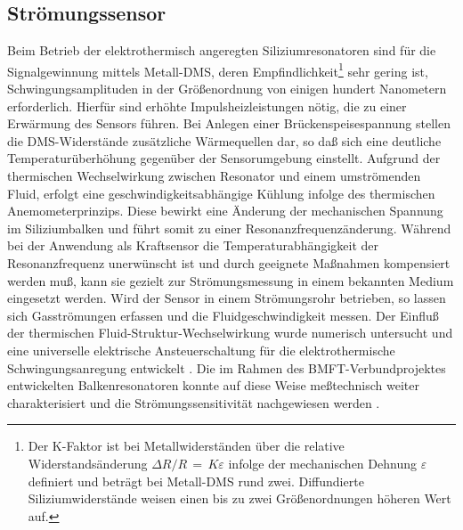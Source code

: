 \subsection{Strömungssensor}
\label{stroemungssensor}

Beim Betrieb der elektrothermisch angeregten Siliziumresonatoren sind
für die Signalgewinnung mittels Metall-DMS, deren
Empfindlichkeit\footnote{Der K-Faktor ist bei Metallwiderständen über
die relative Widerstandsänderung $\Delta R/R \, = \, K \varepsilon$
infolge der mechanischen Dehnung $\varepsilon$
definiert und beträgt bei Metall-DMS rund zwei. Diffundierte
Siliziumwiderstände weisen einen bis zu zwei Größenordnungen höheren
Wert auf.} sehr gering ist,
Schwingungsamplituden in der Größenordnung von einigen hundert
Nanometern erforderlich. Hierfür sind erhöhte Impulsheizleistungen nötig,
die zu einer Erwärmung des Sensors führen. Bei Anlegen einer
Brückenspeisespannung stellen die DMS-Widerstände zusätzliche Wärmequellen
dar, so daß sich eine deutliche Temperaturüberhöhung gegenüber der
Sensorumgebung einstellt. Aufgrund der thermischen Wechselwirkung zwischen
Resonator und einem umströmenden Fluid, erfolgt eine
geschwindigkeitsabhängige Kühlung infolge des thermischen
Anemometerprinzips. Diese bewirkt eine Änderung der mechanischen
Spannung im Siliziumbalken und führt somit zu einer Resonanzfrequenzänderung.
Während bei der Anwendung als Kraftsensor die Temperaturabhängigkeit der
Resonanzfrequenz unerwünscht ist und durch geeignete Maßnahmen kompensiert
werden muß, kann sie gezielt zur Strömungsmessung in einem bekannten Medium
eingesetzt werden. Wird der Sensor in einem Strömungsrohr betrieben, so
lassen sich
Gasströmungen erfassen und die Fluidgeschwindigkeit messen. Der Einfluß der
thermischen Fluid-Struktur-Wechselwirkung wurde numerisch untersucht
\cite{Mes93} und eine universelle elektrische Ansteuerschaltung für die
elektrothermische
Schwingungsanregung entwickelt \cite{Wie93}. Die im Rahmen des
BMFT-Verbundprojektes entwickelten Balkenresonatoren konnte auf diese Weise
meßtechnisch weiter charakterisiert und die Strömungssensitivität
nachgewiesen werden \cite{Fab93b}.
